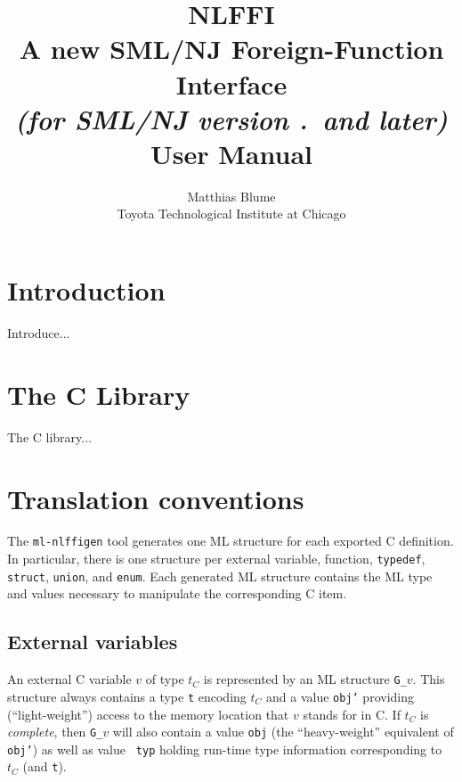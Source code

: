 \documentclass[titlepage,letterpaper]{article}
\author{Matthias Blume \\
Toyota Technological Institute at Chicago}
\title{{\bf NLFFI}\\
A new SML/NJ Foreign-Function Interface \\
{\it\small (for SML/NJ version \smlmj.\smlmn~and later)} \\
User Manual}
\begin{document}


\maketitle

\pagebreak

\tableofcontents

\pagebreak

\section{Introduction}

Introduce...

\section{The C Library}

The C library...

\section{Translation conventions}

The {\tt ml-nlffigen} tool generates one ML structure for each
exported C definition.  In particular, there is one structure per
external variable, function, {\tt typedef}, {\tt struct}, {\tt union},
and {\tt enum}.
Each generated ML structure contains the ML type and values necessary
to manipulate the corresponding C item.

\subsection{External variables}

An external C variable $v$ of type $t_C$ is represented by an ML
structure {\tt G\_}$v$.  This structure always contains a type {\tt t}
encoding $t_C$ and a value {\tt obj'} providing (``light-weight'')
access to the memory location that $v$ stands for in C.  If $t_C$ is
{\em complete}, then {\tt G\_}$v$ will also contain a value {\tt obj}
(the ``heavy-weight'' equivalent of {\tt obj'}) as well as value {\tt
  typ} holding run-time type information corresponding to $t_C$ (and
{\tt t}).
\end{document}
